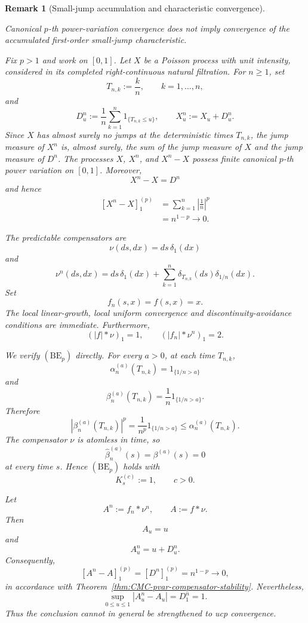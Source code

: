 \documentclass[a4paper,10pt]{article}
\newtheorem{rema}[thm]{Remark}
\begin{document}
\begin{rema}[Small-jump accumulation and characteristic convergence]
\label{rema:small-jump-cloud}

Canonical \(p\)-th power-variation convergence does not imply
convergence of the accumulated first-order small-jump characteristic.

Fix \(p>1\) and work on \([0,1]\). Let \(X\) be a Poisson process with
unit intensity, considered in its completed right-continuous natural
filtration. For \(n\ge1\), set
\[
        T_{n,k}:=\frac{k}{n},
        \qquad k=1,\ldots,n,
\]
and
\[
        D_u^n
        :=
        \frac1n
        \sum_{k=1}^n
        1_{\{T_{n,k}\le u\}},
        \qquad
        X_u^n:=X_u+D_u^n.
\]
Since \(X\) has almost surely no jumps at the deterministic times
\(T_{n,k}\), the jump measure of \(X^n\) is, almost surely, the sum of
the jump measure of \(X\) and the jump measure of \(D^n\). The
processes \(X\), \(X^n\), and \(X^n-X\) possess finite canonical
\(p\)-th power variation on \([0,1]\). Moreover,
\[
        X^n-X=D^n
\]
and hence
\[
\begin{aligned}
[X^n-X]^{(p)}_1
&=
\sum_{k=1}^n
\left|\frac1n\right|^p\\
&=
n^{1-p}
\longrightarrow0.
\end{aligned}
\]

The predictable compensators are
\[
        \nu(ds,dx)
        =
        ds\,\delta_1(dx)
\]
and
\[
        \nu^n(ds,dx)
        =
        ds\,\delta_1(dx)
        +
        \sum_{k=1}^n
        \delta_{T_{n,k}}(ds)\delta_{1/n}(dx).
\]
Set
\[
        f_n(s,x)=f(s,x)=x.
\]
The local linear-growth, local uniform convergence and
discontinuity-avoidance conditions are immediate. Furthermore,
\[
        (|f|*\nu)_1=1,
        \qquad
        (|f_n|*\nu^n)_1=2.
\]

We verify \((\mathrm{BE}_p)\) directly. For every \(a>0\), at each
time \(T_{n,k}\),
\[
        \alpha_n^{(a)}(T_{n,k})
        =
        1_{\{1/n>a\}}
\]
and
\[
        \beta_n^{(a)}(T_{n,k})
        =
        \frac1n1_{\{1/n>a\}}.
\]
Therefore
\[
        |\beta_n^{(a)}(T_{n,k})|^p
        =
        \frac1{n^p}1_{\{1/n>a\}}
        \le
        \alpha_n^{(a)}(T_{n,k}).
\]
The compensator \(\nu\) is atomless in time, so
\[
        \widehat\beta_n^{(a)}(s)
        =
        \beta^{(a)}(s)
        =
        0
\]
at every time \(s\). Hence \((\mathrm{BE}_p)\) holds with
\[
        K^{(c)}_s:=1,
        \qquad c>0.
\]

Let
\[
        A^n:=f_n*\nu^n,
        \qquad
        A:=f*\nu.
\]
Then
\[
        A_u=u
\]
and
\[
        A_u^n=u+D_u^n.
\]
Consequently,
\[
        [A^n-A]^{(p)}_1
        =
        [D^n]^{(p)}_1
        =
        n^{1-p}
        \longrightarrow0,
\]
in accordance with
Theorem~\ref{thm:CMC-pvar-compensator-stability}. Nevertheless,
\[
        \sup_{0\le u\le1}|A_u^n-A_u|
        =
        D_1^n
        =
        1.
\]
Thus the conclusion cannot in general be strengthened to ucp
convergence.


\end{rema}
\end{document}
